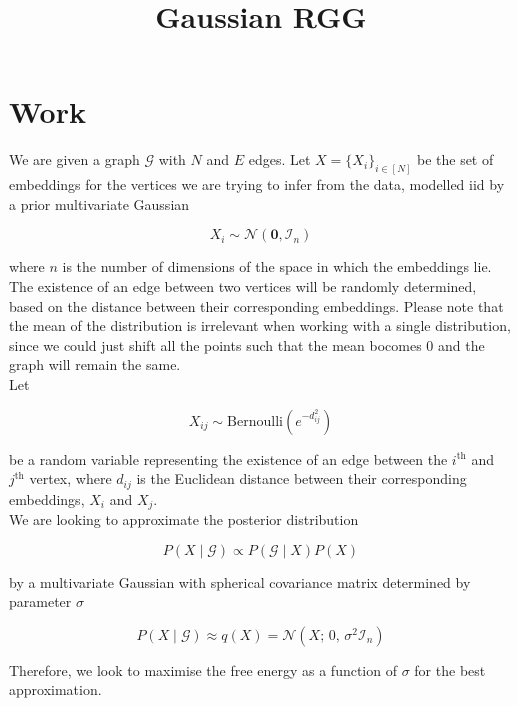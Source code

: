 \documentclass{article}
\title{Gaussian RGG}
\author{}
\date{}
\newcommand{\bs}{\boldsymbol}
\newcommand{\mc}[1]{\mathcal{#1}}
\renewcommand{\bs}{\boldsymbol}
\begin{document}
\maketitle

\section{Work}
We are given a graph $\mc{G}$ with $N$ and $E$ edges. Let $X = \{X_i\}_{i \in [N]}$ be the set of embeddings for the vertices we are trying to infer from the data, modelled iid by a prior multivariate Gaussian

\begin{equation*}
    X_i \sim \mc{N}(\bs{0}, \mc{I}_n)
\end{equation*}

\noindent
where $n$ is the number of dimensions of the space in which the embeddings lie. The existence of an edge between two vertices will be randomly determined, based on the distance between their corresponding embeddings. Please note that the mean of the distribution is irrelevant when working with a single distribution, since we could just shift all the points such that the mean bocomes $0$ and the graph will remain the same.\\

\noindent
Let

\begin{equation*}
    X_{ij} \sim \text{Bernoulli}(e^{-d_{ij}^2})
\end{equation*}

\noindent
be a random variable representing the existence of an edge between the $i^\text{th}$ and $j^\text{th}$ vertex, where $d_{ij}$ is the Euclidean distance between their corresponding embeddings, $X_i$ and $X_j$. \\

\noindent
We are looking to approximate the posterior distribution

\begin{equation*}
    P(X \mid \mc{G}) \propto P(\mc{G} \mid X) P(X)
\end{equation*}

\noindent
by a multivariate Gaussian with spherical covariance matrix determined by parameter $\sigma$

\begin{equation*}
    P(X \mid \mc{G}) \approx q(X) = \mc{N}(X;\, 0,\, \sigma^2 \mc{I}_n)
\end{equation*}

\noindent
Therefore, we look to maximise the free energy as a function of $\sigma$ for the best approximation.
\end{document}
